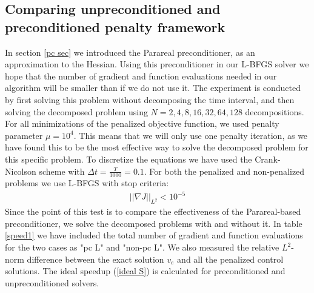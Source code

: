 \subsection{Comparing unpreconditioned and preconditioned penalty framework}
In section \ref{pc sec} we introduced the Parareal preconditioner, as an approximation to the Hessian. Using this preconditioner in our L-BFGS solver we hope that the number of gradient and function evaluations needed in our algorithm will be smaller than if we do not use it. The experiment is conducted by first solving this problem without decomposing the time interval, and then solving the decomposed problem using $N=2,4,8,16,32,64,128$ decompositions. For all minimizations of the penalized objective function, we used penalty parameter $\mu=10^4$. This means that we will only use one penalty iteration, as we have found this to be the most effective way to solve the decomposed problem for this specific problem. To discretize the equations we have used the Crank-Nicolson scheme with $\Delta t= \frac{T}{1000}=0.1$. For both the penalized and non-penalized problems we use L-BFGS with stop criteria:
\begin{align*}
||\nabla J||_{L^2} <10^{-5}
\end{align*}  
Since the point of this test is to compare the effectiveness of the Parareal-based preconditioner, we solve the decomposed problems with and without it. In table \ref{speed1} we have included the total number of gradient and function evaluations for the two cases as "pc L" and "non-pc L". We also measured the relative $L^2$-norm difference between the exact solution $v_e$ and all the penalized control solutions. The ideal speedup (\ref{ideal S}) is calculated for preconditioned and unpreconditioned solvers.
\\
\\
